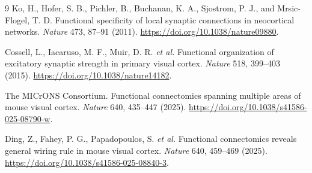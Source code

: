 \documentclass[10pt,twocolumn]{article}
\begin{document}
\begin{thebibliography}{9}
Ko, H., Hofer, S. B., Pichler, B., Buchanan, K. A., Sjostrom, P. J., and Mrsic-Flogel, T. D. Functional specificity of local synaptic connections in neocortical networks. \textit{Nature} 473, 87--91 (2011). \url{https://doi.org/10.1038/nature09880}.

Cossell, L., Iacaruso, M. F., Muir, D. R. \textit{et al.} Functional organization of excitatory synaptic strength in primary visual cortex. \textit{Nature} 518, 399--403 (2015). \url{https://doi.org/10.1038/nature14182}.

The MICrONS Consortium. Functional connectomics spanning multiple areas of mouse visual cortex. \textit{Nature} 640, 435--447 (2025). \url{https://doi.org/10.1038/s41586-025-08790-w}.

Ding, Z., Fahey, P. G., Papadopoulos, S. \textit{et al.} Functional connectomics reveals general wiring rule in mouse visual cortex. \textit{Nature} 640, 459--469 (2025). \url{https://doi.org/10.1038/s41586-025-08840-3}.
\end{thebibliography}
\end{document}
